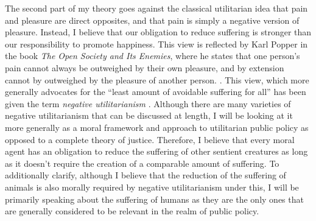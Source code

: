 \documentclass[12pt]{article}
\begin{document}
The second part of my theory goes against the classical utilitarian idea that pain and pleasure are direct opposites, and that pain is simply a negative version of pleasure. Instead, I believe that our obligation to reduce suffering is stronger than our responsibility to promote happiness.
This view is reflected by Karl Popper in the book \textit{The Open Society and Its Enemies}, where he states that one person's pain cannot always be outweighed by their own pleasure, and by extension cannot by outweighed by the pleasure of another person. \autocite[285]{popper2002}.
This view, which more generally advocates for the ``least amount of avoidable suffering for all'' has been given the term \textit{negative utilitarianism} \autocite[542]{smart1958}.
Although there are many varieties of negative utilitarianism that can be discussed at length, I will be looking at it more generally as a moral framework and approach to utilitarian public policy as opposed to a complete theory of justice.
Therefore, I believe that every moral agent has an obligation to reduce the suffering of other sentient creatures as long as it doesn't require the creation of a comparable amount of suffering.
To additionally clarify, although I believe that the reduction of the suffering of animals is also morally required by negative utilitarianism under this, I will be primarily speaking about the suffering of humans as they are the only ones that are generally considered to be relevant in the realm of public policy.
\end{document}

